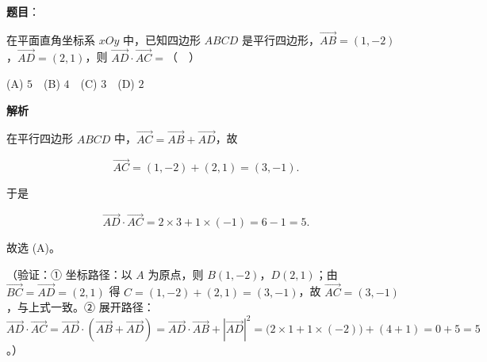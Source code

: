 \begin{answer}

\textbf{题目}：

在平面直角坐标系 \(xOy\) 中，已知四边形 \(ABCD\) 是平行四边形，\(\overrightarrow{AB}=(1,-2)\)，\(\overrightarrow{AD}=(2,1)\)，则 \(\overrightarrow{AD}\cdot\overrightarrow{AC}=\)（　）

(A) \(5\)　(B) \(4\)　(C) \(3\)　(D) \(2\)

\textbf{解析}

在平行四边形 \(ABCD\) 中，\(\overrightarrow{AC}=\overrightarrow{AB}+\overrightarrow{AD}\)，故

\nopagebreak[4]
\[
\overrightarrow{AC}=(1,-2)+(2,1)=(3,-1).
\]

于是

\nopagebreak[4]
\[
\overrightarrow{AD}\cdot\overrightarrow{AC}=2\times 3+1\times(-1)=6-1=5.
\]

故选 (A)。

（验证：① 坐标路径：以 \(A\) 为原点，则 \(B(1,-2)\)，\(D(2,1)\)；由 \(\overrightarrow{BC}=\overrightarrow{AD}=(2,1)\) 得 \(C=(1,-2)+(2,1)=(3,-1)\)，故 \(\overrightarrow{AC}=(3,-1)\)，与上式一致。② 展开路径：\(\overrightarrow{AD}\cdot\overrightarrow{AC}=\overrightarrow{AD}\cdot(\overrightarrow{AB}+\overrightarrow{AD})=\overrightarrow{AD}\cdot\overrightarrow{AB}+|\overrightarrow{AD}|^2=\bigl(2\times 1+1\times(-2)\bigr)+(4+1)=0+5=5\)。）


\end{answer}
